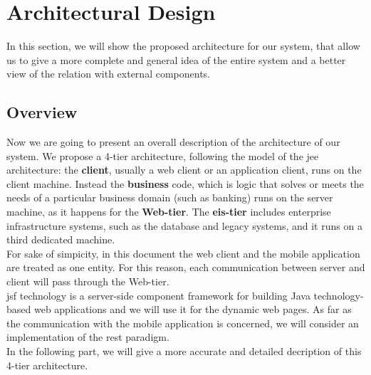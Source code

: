 \section{Architectural Design} \label{sec:arch-design}

In this section, we will show the proposed architecture for our system, that allow us to give a more complete and general idea of the entire system and a better view of the relation with external components.

\subsection{Overview} \label{subsec:overview}
Now we are going to present an overall description of the architecture of our system. We propose a 4-tier architecture, following the model of the \acl{jee} architecture: the \textbf{client}, usually a web client or an application client, runs on the client machine. Instead the \textbf{business} code, which is logic that solves or meets the needs of a particular business domain (such as banking) runs on the server machine, as it happens for the \textbf{Web-tier}. The \textbf{\acl{eis}-tier} includes enterprise infrastructure systems, such as the database and legacy systems, and it runs on a third dedicated machine. \\For sake of simpicity, in this document the web client and the mobile application are treated as one entity. For this reason, each communication between server and client will pass through the Web-tier.
\\ \acs{jsf} technology is a server-side component framework for building Java technology-based web applications and we will use it for the dynamic web pages.
As far as the communication with the mobile application is concerned, we will consider an implementation of the \acs{rest} paradigm.\\
\newline
In the following part, we will give a more accurate and detailed decription of this 4-tier architecture.

